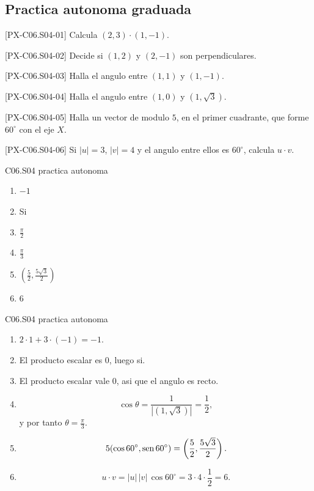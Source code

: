 \subsection*{Practica autonoma graduada}
\begin{exercise}{[PX-C06.S04-01] Calcula \((2,3)\cdot (1,-1)\).}
\end{exercise}
\begin{exercise}{[PX-C06.S04-02] Decide si \((1,2)\) y \((2,-1)\) son perpendiculares.}
\end{exercise}
\begin{exercise}{[PX-C06.S04-03] Halla el angulo entre \((1,1)\) y \((1,-1)\).}
\end{exercise}
\begin{exercise}{[PX-C06.S04-04] Halla el angulo entre \((1,0)\) y \((1,\sqrt{3})\).}
\end{exercise}
\begin{exercise}{[PX-C06.S04-05] Halla un vector de modulo \(5\), en el primer cuadrante, que forme \(60^\circ\) con el eje \(X\).}
\end{exercise}
\begin{exercise}{[PX-C06.S04-06] Si \(|u|=3\), \(|v|=4\) y el angulo entre ellos es \(60^\circ\), calcula \(u\cdot v\).}
\end{exercise}

\begin{shortanswer}{C06.S04 practica autonoma}
\begin{enumerate}[label=\textbf{PX-C06.S04-\arabic*:}, leftmargin=*]
  \item \(-1\)
  \item Si
  \item \(\frac{\pi}{2}\)
  \item \(\frac{\pi}{3}\)
  \item \(\left(\frac{5}{2},\frac{5\sqrt{3}}{2}\right)\)
  \item \(6\)
\end{enumerate}
\end{shortanswer}

\begin{fullsolution}{C06.S04 practica autonoma}
\begin{enumerate}[label=\textbf{PX-C06.S04-\arabic*:}, leftmargin=*]
  \item \(2\cdot 1+3\cdot (-1)=-1\).
  \item El producto escalar es \(0\), luego si.
  \item El producto escalar vale \(0\), asi que el angulo es recto.
  \item
  \[
  \cos \theta=\frac{1}{|(1,\sqrt{3})|}=\frac{1}{2},
  \]
  y por tanto \(\theta=\frac{\pi}{3}\).
  \item
  \[
  5(\cos 60^\circ,\operatorname{sen} 60^\circ)=\left(\frac{5}{2},\frac{5\sqrt{3}}{2}\right).
  \]
  \item
  \[
  u\cdot v=|u|\,|v|\,\cos 60^\circ=3\cdot 4\cdot \frac{1}{2}=6.
  \]
\end{enumerate}
\end{fullsolution}

